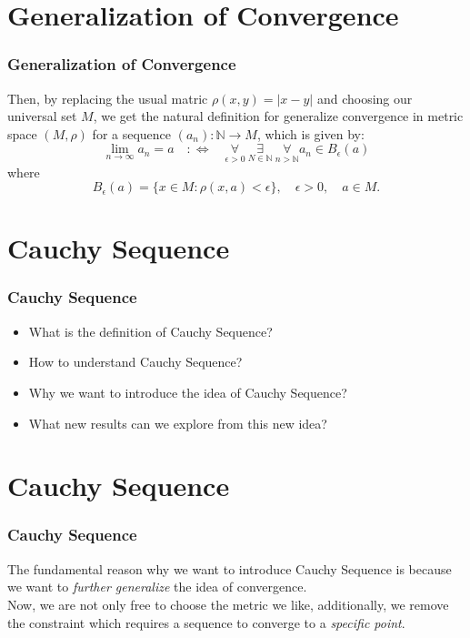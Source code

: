 \documentclass[12pt, t]{beamer}
\renewcommand{\emph}[1]{{\color{Turquoise3}\textsl{#1}}}
\begin{document}
\section{Generalization of Convergence}
\begin{frame}
    \frametitle{Generalization of Convergence}
    Then, by replacing the usual matric $\rho(x,y)=|x-y|$ and choosing our universal set $M$, we get the natural definition for
    generalize convergence in metric space $(M,\rho)$ for a sequence $(a_n):\mathbb{N}\rightarrow M$, which is given by:
    \begin{equation*}
        \lim_{n\rightarrow \infty}a_n=a\quad :\Leftrightarrow \quad \underset{\epsilon>0}{\forall}\ \underset{N\in \mathbb{N}}{\exists}\ \underset{n>\mathbb{N}}{\forall} a_n\in B_\epsilon(a)
    \end{equation*}
    where
    \begin{equation*}
        B_\epsilon(a)=\{ x\in M:\rho(x,a)<\epsilon\},\quad \epsilon>0,\quad a\in M.
    \end{equation*}

\end{frame}

\section{Cauchy Sequence}
\begin{frame}
    \frametitle{Cauchy Sequence}
    \begin{itemize}
        \item What is the definition of Cauchy Sequence?
        \item How to understand Cauchy Sequence?
        \item Why we want to introduce the idea of Cauchy Sequence?
        \item What new results can we explore from this new idea?
    \end{itemize}

\end{frame}

\section{Cauchy Sequence}
\begin{frame}
    \frametitle{Cauchy Sequence}
    The fundamental reason why we want to introduce Cauchy Sequence is because we want to \emph{further generalize} the idea of
    convergence.\\
    \vspace{0.5em}
    Now, we are not only free to choose the metric we like, additionally, we remove the constraint which requires a sequence
    to converge to a \emph{specific point}.

\end{frame}
\end{document}
